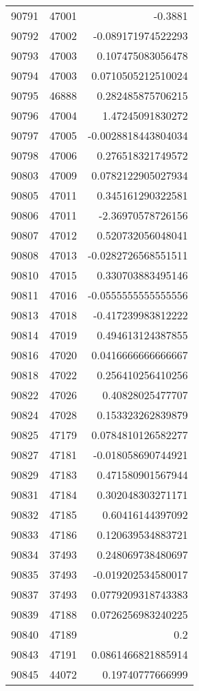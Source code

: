 \begin{tabular}{r | r | r}
90791 & 47001 & -0.3881 \\
90792 & 47002 & -0.089171974522293 \\
90793 & 47003 & 0.107475083056478 \\
90794 & 47003 & 0.0710505212510024 \\
90795 & 46888 & 0.282485875706215 \\
90796 & 47004 & 1.47245091830272 \\
90797 & 47005 & -0.0028818443804034 \\
90798 & 47006 & 0.276518321749572 \\
90803 & 47009 & 0.0782122905027934 \\
90805 & 47011 & 0.345161290322581 \\
90806 & 47011 & -2.36970578726156 \\
90807 & 47012 & 0.520732056048041 \\
90808 & 47013 & -0.0282726568551511 \\
90810 & 47015 & 0.330703883495146 \\
90811 & 47016 & -0.0555555555555556 \\
90813 & 47018 & -0.417239983812222 \\
90814 & 47019 & 0.494613124387855 \\
90816 & 47020 & 0.0416666666666667 \\
90818 & 47022 & 0.256410256410256 \\
90822 & 47026 & 0.40828025477707 \\
90824 & 47028 & 0.153323262839879 \\
90825 & 47179 & 0.0784810126582277 \\
90827 & 47181 & -0.018058690744921 \\
90829 & 47183 & 0.471580901567944 \\
90831 & 47184 & 0.302048303271171 \\
90832 & 47185 & 0.60416144397092 \\
90833 & 47186 & 0.120639534883721 \\
90834 & 37493 & 0.248069738480697 \\
90835 & 37493 & -0.019202534580017 \\
90837 & 37493 & 0.0779209318743383 \\
90839 & 47188 & 0.0726256983240225 \\
90840 & 47189 & 0.2 \\
90843 & 47191 & 0.0861466821885914 \\
90845 & 44072 & 0.19740777666999 \\

\end{tabular}
